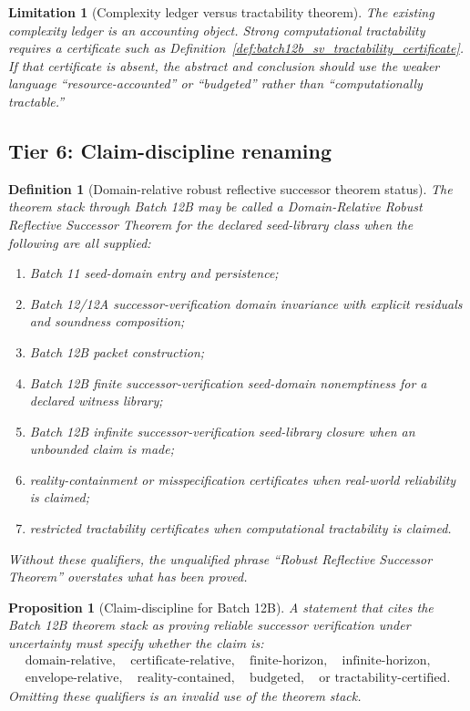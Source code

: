 \documentclass[11pt]{article}
\newtheorem{proposition}[theorem]{Proposition}
\newtheorem{definition}[theorem]{Definition}
\newtheorem{limitation}[theorem]{Limitation}
\newcommand{\1}{\mathbf{1}}
\begin{document}
\begin{limitation}[Complexity ledger versus tractability theorem]
\label{lim:batch12b_tractability_discipline}
The existing complexity ledger is an accounting object.  Strong computational tractability requires a certificate such as Definition~\ref{def:batch12b_sv_tractability_certificate}.  If that certificate is absent, the abstract and conclusion should use the weaker language ``resource-accounted'' or ``budgeted'' rather than ``computationally tractable.''
\end{limitation}

\subsection{Tier 6: Claim-discipline renaming}

\begin{definition}[Domain-relative robust reflective successor theorem status]
\label{def:batch12b_domain_relative_rrst_status}
The theorem stack through Batch 12B may be called a \emph{Domain-Relative Robust Reflective Successor Theorem} for the declared seed-library class when the following are all supplied:
\begin{enumerate}[label=(\roman*),leftmargin=1.5em]
    \item Batch 11 seed-domain entry and persistence;
    \item Batch 12/12A successor-verification domain invariance with explicit residuals and soundness composition;
    \item Batch 12B packet construction;
    \item Batch 12B finite successor-verification seed-domain nonemptiness for a declared witness library;
    \item Batch 12B infinite successor-verification seed-library closure when an unbounded claim is made;
    \item reality-containment or misspecification certificates when real-world reliability is claimed;
    \item restricted tractability certificates when computational tractability is claimed.
\end{enumerate}
Without these qualifiers, the unqualified phrase ``Robust Reflective Successor Theorem'' overstates what has been proved.
\end{definition}

\begin{proposition}[Claim-discipline for Batch 12B]
\label{prop:batch12b_claim_discipline}
A statement that cites the Batch 12B theorem stack as proving reliable successor verification under uncertainty must specify whether the claim is:
\[
\begin{gathered}
\text{domain-relative},\quad
\text{certificate-relative},\quad
\text{finite-horizon},\quad
\text{infinite-horizon},\\
\text{envelope-relative},\quad
\text{reality-contained},\quad
\text{budgeted},\quad
\text{or tractability-certified}.
\end{gathered}
\]
Omitting these qualifiers is an invalid use of the theorem stack.
\end{proposition}
\end{document}
